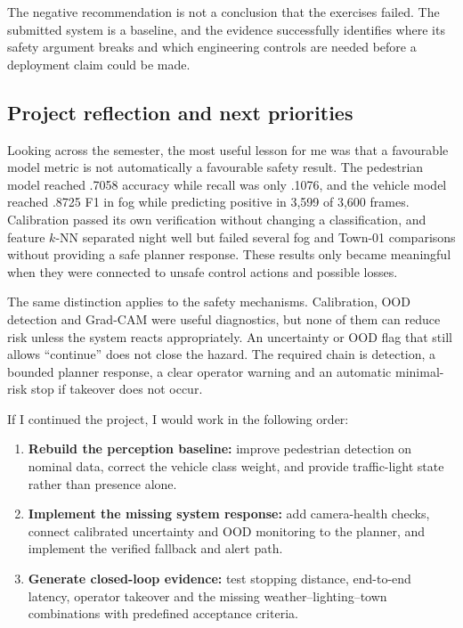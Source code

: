 \documentclass[nologo,a4paper,12pt]{article}
\begin{document}
The negative recommendation is not a conclusion that the exercises failed. The submitted system
is a baseline, and the evidence successfully identifies where its safety argument breaks and which
engineering controls are needed before a deployment claim could be made.

\subsection{Project reflection and next priorities}

Looking across the semester, the most useful lesson for me was that a favourable model metric is
not automatically a favourable safety result. The pedestrian model reached .7058 accuracy while
recall was only .1076, and the vehicle model reached .8725 F1 in fog while predicting positive in
3,599 of 3,600 frames. Calibration passed its own verification without changing a classification,
and feature $k$-NN separated night well but failed several fog and Town-01 comparisons without
providing a safe planner response. These results
only became meaningful when they were connected to unsafe control actions and possible losses.

The same distinction applies to the safety mechanisms. Calibration, OOD detection and Grad-CAM
were useful diagnostics, but none of them can reduce risk unless the system reacts appropriately.
An uncertainty or OOD flag that still allows ``continue'' does not close the hazard. The required
chain is detection, a bounded planner response, a clear operator warning and an automatic
minimal-risk stop if takeover does not occur.

If I continued the project, I would work in the following order:

\begin{enumerate}
  \item \textbf{Rebuild the perception baseline:} improve pedestrian detection on nominal data,
  correct the vehicle class weight, and provide traffic-light state rather than presence alone.
  \item \textbf{Implement the missing system response:} add camera-health checks, connect calibrated
  uncertainty and OOD monitoring to the planner, and implement the verified fallback and alert path.
  \item \textbf{Generate closed-loop evidence:} test stopping distance, end-to-end latency, operator
  takeover and the missing weather--lighting--town combinations with predefined acceptance criteria.
\end{enumerate}
\end{document}
